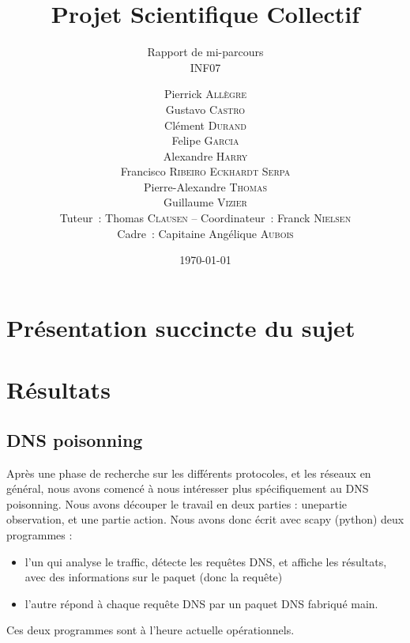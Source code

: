 \documentclass[a4paper, 12pt,twoside]{article}
\title{Projet Scientifique Collectif}
\author{Pierrick \textsc{Allègre} \\
		Gustavo \textsc{Castro} \\
		Clément \textsc{Durand} \\
		Felipe \textsc{Garcia} \\
		Alexandre \textsc{Harry} \\
		Francisco \textsc{Ribeiro Eckhardt Serpa} \\
		Pierre-Alexandre \textsc{Thomas} \\
		Guillaume \textsc{Vizier} \\
        Tuteur~: Thomas \textsc{Clausen} -- Coordinateur~: Franck \textsc{Nielsen} \\
        Cadre~: Capitaine Angélique \textsc{Aubois} \\}
\subtitle{Rapport de mi-parcours \\ INF07}
\date{\today}
\begin{document}
\maketitle
\renewcommand{\baselinestretch}{1.1}
\setlength{\parskip}{0.5em}
\tableofcontents
\clearpage

\section*{Présentation succincte du sujet}
	
\section{Résultats}
	\subsection{DNS poisonning}
	
	Après une phase de recherche sur les différents protocoles, et les réseaux en général, nous avons comencé à nous intéresser plus spécifiquement au DNS poisonning. Nous avons découper le travail en deux parties : unepartie observation, et une partie action. Nous avons donc écrit avec scapy (python) deux programmes : \begin{itemize}
	\item l'un qui analyse le traffic, détecte les requêtes DNS, et affiche les résultats, avec des informations sur le paquet (donc la requête)
	\item l'autre répond à chaque requête DNS par un paquet DNS fabriqué main.
\end{itemize}

	Ces deux programmes sont à l'heure actuelle opérationnels. 
	
\end{document}
